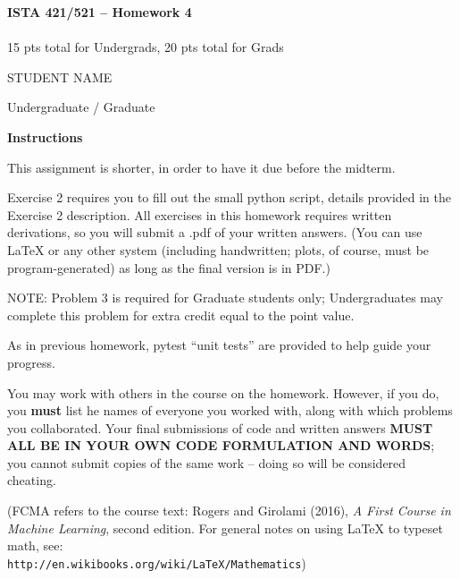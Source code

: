 \documentclass[10pt]{article}
\newcommand{\latex}{\LaTeX\xspace}
\begin{document}
\begin{center}
    {\Large {\bf ISTA 421/521 -- Homework 4}} \\
     \\
    15 pts total for Undergrads, 20 pts total for Grads\\
    
\end{center}

\begin{flushright}
STUDENT NAME %

Undergraduate / Graduate %
\end{flushright}

\vspace{1cm}
{\Large {\bf Instructions}}

This assignment is shorter, in order to have it due before the midterm.

Exercise 2 requires you to fill out the small python script, details provided in the Exercise 2 description. All exercises in this homework requires written derivations, so you will submit a .pdf of your written answers. (You can use \latex or any other system (including handwritten; plots, of course, must be program-generated) as long as the final version is in PDF.)

NOTE: Problem 3 is required for Graduate students only; Undergraduates may complete this problem for extra credit equal to the point value.

As in previous homework, pytest ``unit tests'' are provided to help guide your progress.

You may work with others in the course on the homework. However, if you do, you {\bf must} list he names of everyone you worked with, along with which problems you collaborated. Your final submissions of code and written answers {\bf MUST ALL BE IN YOUR OWN CODE FORMULATION AND WORDS}; you cannot submit copies of the same work -- doing so will be considered cheating.

(FCMA refers to the course text: Rogers and Girolami (2016), {\em A First Course in Machine Learning}, second edition.  For general notes on using \latex to typeset math, see: \\{\tt http://en.wikibooks.org/wiki/LaTeX/Mathematics})
\vspace{.5cm}



\end{document}
